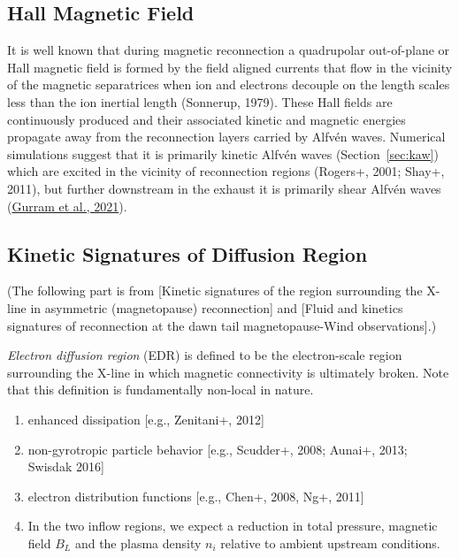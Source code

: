\documentclass[
  notoc %
]{tufte-book}
\providecommand{\tightlist}{%
  \setlength{\itemsep}{0pt}\setlength{\parskip}{0pt}
}
\begin{document}
\hypertarget{hall-magnetic-field}{%
\subsection{Hall Magnetic Field}\label{hall-magnetic-field}}

It is well known that during magnetic reconnection a quadrupolar
out-of-plane or Hall magnetic field is formed by the field aligned
currents that flow in the vicinity of the magnetic separatrices when ion
and electrons decouple on the length scales less than the ion inertial
length (Sonnerup, 1979). These Hall fields are continuously produced and
their associated kinetic and magnetic energies propagate away from the
reconnection layers carried by Alfvén waves. Numerical simulations
suggest that it is primarily kinetic Alfvén waves
(Section~\ref{sec:kaw}) which are excited in the vicinity of
reconnection regions (Rogers+, 2001; Shay+, 2011), but further
downstream in the exhaust it is primarily shear Alfvén waves
(\protect\hyperlink{ref-gurram2021shear}{Gurram et al., 2021}).

\hypertarget{kinetic-signatures-of-diffusion-region}{%
\subsection{Kinetic Signatures of Diffusion
Region}\label{kinetic-signatures-of-diffusion-region}}

(The following part is from {[}Kinetic signatures of the region
surrounding the X-line in asymmetric (magnetopause) reconnection{]} and
{[}Fluid and kinetics signatures of reconnection at the dawn tail
magnetopause-Wind observations{]}.)

\emph{Electron diffusion region} (EDR) is defined to be the
electron-scale region surrounding the X-line in which magnetic
connectivity is ultimately broken. Note that this definition is
fundamentally non-local in nature.

\begin{enumerate}
\def\labelenumi{\arabic{enumi}.}
\tightlist
\item
  enhanced dissipation {[}e.g., Zenitani+, 2012{]}
\item
  non-gyrotropic particle behavior {[}e.g., Scudder+, 2008; Aunai+,
  2013; Swisdak 2016{]}
\item
  electron distribution functions {[}e.g., Chen+, 2008, Ng+, 2011{]}
\item
  In the two inflow regions, we expect a reduction in total pressure,
  magnetic field \(B_L\) and the plasma density \(n_i\) relative to
  ambient upstream conditions.
\end{enumerate}
\end{document}
